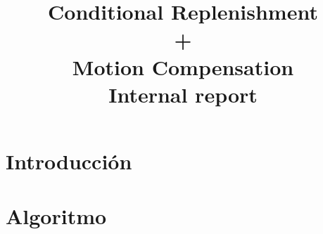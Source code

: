 \documentclass[11pt,a4paper]{article}
\begin{document}
\title{\Huge{Conditional Replenishment \\ + \\ Motion Compensation}\\\Large{Internal report}}
\date{}

\maketitle 

\section{Introducci\'on}



\section{Algoritmo}
\end{document}
